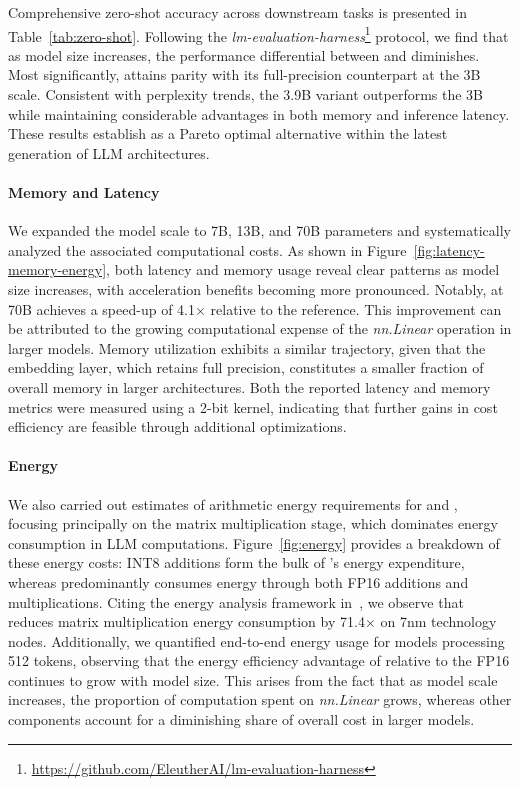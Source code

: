 Comprehensive zero-shot accuracy across downstream tasks is presented in Table~\ref{tab:zero-shot}. Following the \emph{lm-evaluation-harness}\footnote{\url{https://github.com/EleutherAI/lm-evaluation-harness}} protocol, we find that as model size increases, the performance differential between  and  diminishes. Most significantly,  attains parity with its full-precision counterpart at the 3B scale. Consistent with perplexity trends, the 3.9B  variant outperforms the 3B  while maintaining considerable advantages in both memory and inference latency. These results establish  as a Pareto optimal alternative within the latest generation of LLM architectures.

\paragraph{Memory and Latency}

We expanded the model scale to 7B, 13B, and 70B parameters and systematically analyzed the associated computational costs. As shown in Figure~\ref{fig:latency-memory-energy}, both latency and memory usage reveal clear patterns as model size increases, with acceleration benefits becoming more pronounced. Notably,  at 70B achieves a speed-up of 4.1$\times$ relative to the  reference. This improvement can be attributed to the growing computational expense of the \emph{nn.Linear} operation in larger models. Memory utilization exhibits a similar trajectory, given that the embedding layer, which retains full precision, constitutes a smaller fraction of overall memory in larger architectures. Both the reported latency and memory metrics were measured using a 2-bit kernel, indicating that further gains in cost efficiency are feasible through additional optimizations.

\paragraph{Energy}

We also carried out estimates of arithmetic energy requirements for  and , focusing principally on the matrix multiplication stage, which dominates energy consumption in LLM computations. Figure~\ref{fig:energy} provides a breakdown of these energy costs: INT8 additions form the bulk of 's energy expenditure, whereas  predominantly consumes energy through both FP16 additions and multiplications. Citing the energy analysis framework in~\cite{energycost, pokebnn}, we observe that  reduces matrix multiplication energy consumption by 71.4$\times$ on 7nm technology nodes. Additionally, we quantified end-to-end energy usage for models processing 512 tokens, observing that the energy efficiency advantage of  relative to the FP16  continues to grow with model size. This arises from the fact that as model scale increases, the proportion of computation spent on \emph{nn.Linear} grows, whereas other components account for a diminishing share of overall cost in larger models.

